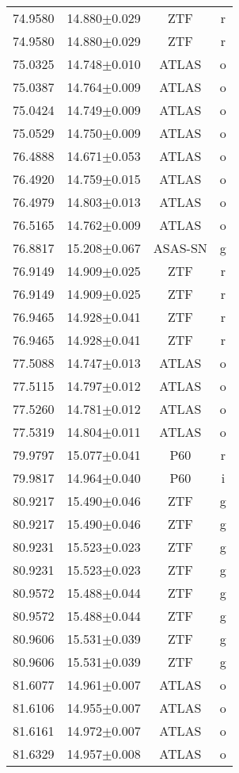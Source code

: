 \begin{table}
\begin{tabular}{cccc}
74.9580 & 14.880$\pm$0.029 & ZTF & r \\
74.9580 & 14.880$\pm$0.029 & ZTF & r \\
75.0325 & 14.748$\pm$0.010 & ATLAS & o \\
75.0387 & 14.764$\pm$0.009 & ATLAS & o \\
75.0424 & 14.749$\pm$0.009 & ATLAS & o \\
75.0529 & 14.750$\pm$0.009 & ATLAS & o \\
76.4888 & 14.671$\pm$0.053 & ATLAS & o \\
76.4920 & 14.759$\pm$0.015 & ATLAS & o \\
76.4979 & 14.803$\pm$0.013 & ATLAS & o \\
76.5165 & 14.762$\pm$0.009 & ATLAS & o \\
76.8817 & 15.208$\pm$0.067 & ASAS-SN & g \\
76.9149 & 14.909$\pm$0.025 & ZTF & r \\
76.9149 & 14.909$\pm$0.025 & ZTF & r \\
76.9465 & 14.928$\pm$0.041 & ZTF & r \\
76.9465 & 14.928$\pm$0.041 & ZTF & r \\
77.5088 & 14.747$\pm$0.013 & ATLAS & o \\
77.5115 & 14.797$\pm$0.012 & ATLAS & o \\
77.5260 & 14.781$\pm$0.012 & ATLAS & o \\
77.5319 & 14.804$\pm$0.011 & ATLAS & o \\
79.9797 & 15.077$\pm$0.041 & P60 & r \\
79.9817 & 14.964$\pm$0.040 & P60 & i \\
80.9217 & 15.490$\pm$0.046 & ZTF & g \\
80.9217 & 15.490$\pm$0.046 & ZTF & g \\
80.9231 & 15.523$\pm$0.023 & ZTF & g \\
80.9231 & 15.523$\pm$0.023 & ZTF & g \\
80.9572 & 15.488$\pm$0.044 & ZTF & g \\
80.9572 & 15.488$\pm$0.044 & ZTF & g \\
80.9606 & 15.531$\pm$0.039 & ZTF & g \\
80.9606 & 15.531$\pm$0.039 & ZTF & g \\
81.6077 & 14.961$\pm$0.007 & ATLAS & o \\
81.6106 & 14.955$\pm$0.007 & ATLAS & o \\
81.6161 & 14.972$\pm$0.007 & ATLAS & o \\
81.6329 & 14.957$\pm$0.008 & ATLAS & o \\

\end{tabular}
\end{table}
